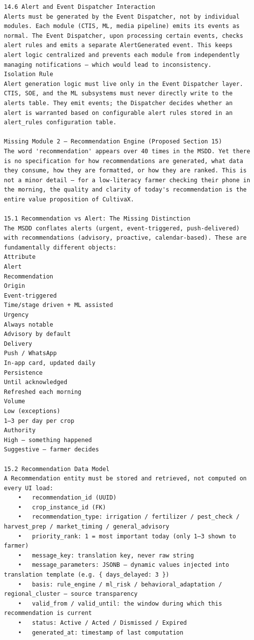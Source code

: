 \documentclass{article}
\begin{document}
\begin{verbatim}
14.6 Alert and Event Dispatcher Interaction
Alerts must be generated by the Event Dispatcher, not by individual modules. Each module (CTIS, ML, media pipeline) emits its events as normal. The Event Dispatcher, upon processing certain events, checks alert rules and emits a separate AlertGenerated event. This keeps alert logic centralized and prevents each module from independently managing notifications — which would lead to inconsistency.
Isolation Rule
Alert generation logic must live only in the Event Dispatcher layer. CTIS, SOE, and the ML subsystems must never directly write to the alerts table. They emit events; the Dispatcher decides whether an alert is warranted based on configurable alert rules stored in an alert_rules configuration table.

Missing Module 2 — Recommendation Engine (Proposed Section 15)
The word 'recommendation' appears over 40 times in the MSDD. Yet there is no specification for how recommendations are generated, what data they consume, how they are formatted, or how they are ranked. This is not a minor detail — for a low-literacy farmer checking their phone in the morning, the quality and clarity of today's recommendation is the entire value proposition of CultivaX.

15.1 Recommendation vs Alert: The Missing Distinction
The MSDD conflates alerts (urgent, event-triggered, push-delivered) with recommendations (advisory, proactive, calendar-based). These are fundamentally different objects:
Attribute
Alert
Recommendation
Origin
Event-triggered
Time/stage driven + ML assisted
Urgency
Always notable
Advisory by default
Delivery
Push / WhatsApp
In-app card, updated daily
Persistence
Until acknowledged
Refreshed each morning
Volume
Low (exceptions)
1–3 per day per crop
Authority
High — something happened
Suggestive — farmer decides

15.2 Recommendation Data Model
A Recommendation entity must be stored and retrieved, not computed on every UI load:
	•	recommendation_id (UUID)
	•	crop_instance_id (FK)
	•	recommendation_type: irrigation / fertilizer / pest_check / harvest_prep / market_timing / general_advisory
	•	priority_rank: 1 = most important today (only 1–3 shown to farmer)
	•	message_key: translation key, never raw string
	•	message_parameters: JSONB — dynamic values injected into translation template (e.g. { days_delayed: 3 })
	•	basis: rule_engine / ml_risk / behavioral_adaptation / regional_cluster — source transparency
	•	valid_from / valid_until: the window during which this recommendation is current
	•	status: Active / Acted / Dismissed / Expired
	•	generated_at: timestamp of last computation


\end{verbatim}
\end{document}
